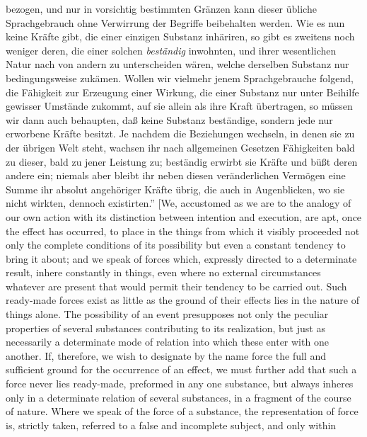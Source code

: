 \documentclass[12pt,a4paper]{book}
\begin{document}
{bezogen, und nur in vorsichtig bestimmten Gränzen kann dieser
übliche Sprachgebrauch ohne Verwirrung der Begriffe beibehalten
werden. Wie es nun keine Kräfte gibt, die einer einzigen Substanz
inhäriren, so gibt es zweitens noch weniger deren, die einer
solchen \emph{beständig} inwohnten, und ihrer wesentlichen Natur nach
von andern zu unterscheiden wären, welche derselben Substanz
nur bedingungsweise zukämen. Wollen wir vielmehr jenem
Sprachgebrauche folgend, die
Fähigkeit zur Erzeugung einer Wirkung,
die einer Substanz nur unter Beihilfe gewisser Umstände zukommt,
auf sie allein als ihre Kraft übertragen, so müssen wir dann
auch behaupten, daß keine Substanz beständige, sondern jede nur
erworbene Kräfte besitzt. Je nachdem die Beziehungen wechseln,
in denen sie zu der übrigen Welt steht, wachsen ihr nach
allgemeinen Gesetzen Fähigkeiten bald zu dieser, bald zu jener
Leistung zu; beständig erwirbt sie Kräfte und büßt deren andere
ein; niemals aber bleibt ihr neben diesen veränderlichen Vermögen
eine Summe ihr absolut angehöriger Kräfte übrig, die auch in
Augenblicken, wo sie nicht wirkten, dennoch existirten.'' [We, accustomed as
we are to the analogy of our own action with its distinction between intention
and execution, are apt, once the effect has occurred, to place in the things
from which it visibly proceeded not only the complete conditions of its
possibility but even a constant tendency to bring it about; and we speak of
forces which, expressly directed to a determinate result, inhere constantly in
things, even where no external circumstances whatever are present that would
permit their tendency to be carried out. Such ready-made forces exist as little
as the ground of their effects lies in the nature of things alone. The
possibility of an event presupposes not only the peculiar properties of several
substances contributing to its realization, but just as necessarily a
determinate mode of relation into which these enter with one another. If,
therefore, we wish to designate by the name force the full and sufficient
ground for the occurrence of an effect, we must further add that such a force
never lies ready-made, preformed in any one substance, but always inheres only
in a determinate relation of several substances, in a fragment of the course of
nature. Where we speak of the force of a substance, the representation of force
is, strictly taken, referred to a false and incomplete subject, and only within
}
\end{document}
